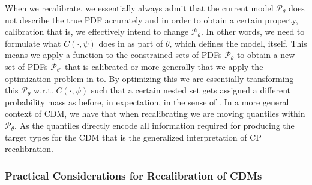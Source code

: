 When we recalibrate, we essentially always admit that the current model $\mathscr{P}_{\theta}$ does not describe the true PDF accurately and in order to obtain a certain property, calibration that is, we effectively intend to change $\mathscr{P}_{\theta}$. In other words, we need to formulate what $C(\cdot, \psi)$ does in  as part of $\theta$, which defines the model, itself. This means we apply a function to the constrained sets of PDFs $\mathscr{P}_{\theta}$ to obtain a new set of PDFs $\mathscr{P}_{\theta'}$ that is calibrated or more generally that we apply the optimization problem in  to. By optimizing this we are essentially transforming this $\mathscr{P}_{\theta}$ w.r.t. $C(\cdot, \psi)$ such that a certain nested set gets assigned a different probability mass as before, in expectation, in the sense of . In a more general context of CDM, we have that when recalibrating we are moving quantiles within $\mathscr{P}_\theta$. As the quantiles directly encode all information required for producing the target types for the CDM that is the generalized interpretation of CP recalibration. %

\subsubsection{Practical Considerations for Recalibration of CDMs}

